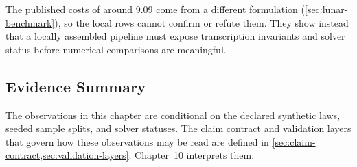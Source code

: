 The published costs of around $9.09$ \citep{keil2020,keil2021} come from a different formulation (\cref{sec:lunar-benchmark}), so the local rows cannot confirm or refute them. They show instead that a locally assembled pipeline must expose transcription invariants and solver status before numerical comparisons are meaningful.

\subsection{Evidence Summary}
\label{sec:experiment-evidence}
The observations in this chapter are conditional on the declared synthetic laws,
seeded sample splits, and solver statuses. The claim contract and validation
layers that govern how these observations may be read are defined in
\cref{sec:claim-contract,sec:validation-layers}; Chapter~10 interprets them.
